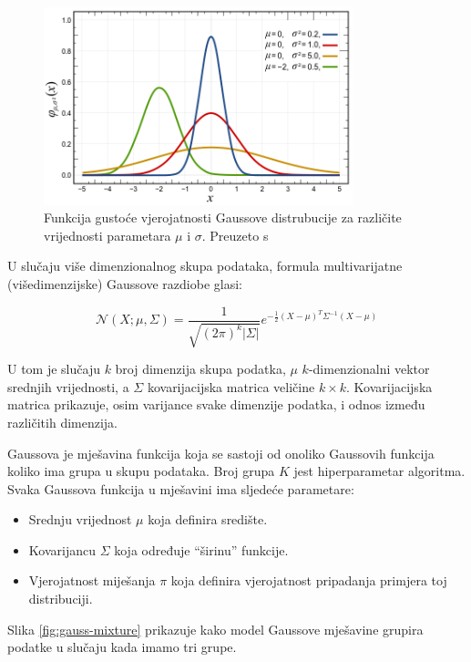 \documentclass[utf8, diplomski, numeric]{fer}
\begin{document}
\begin{figure}[htb]
\includegraphics[width=0.8\textwidth]{images/gauss1.png}
\centering
\caption{Funkcija gustoće vjerojatnosti Gaussove distrubucije za različite vrijednosti parametara $\mu$ i $\sigma$. Preuzeto s  \cite{normalDistWiki}}
\label{fig:gauss1}
\end{figure}

U slučaju više dimenzionalnog skupa podataka, formula multivarijatne (višedimenzijske) Gaussove razdiobe glasi:

\begin{equation}
\mathcal{N}(X;\mu,\Sigma)  =\frac{1}{\sqrt{(2\pi)^{k}|\Sigma|}}e^{-\frac{1}{2}(X-\mu)^T\Sigma^{-1}(X-\mu)}
\end{equation}

U tom je slučaju $k$ broj dimenzija skupa podatka, $\mu$ $k$-dimenzionalni vektor srednjih vrijednosti, a $\Sigma$ kovarijacijska matrica veličine $k \times k$. Kovarijacijska matrica prikazuje, osim varijance svake dimenzije podatka, i odnos između različitih dimenzija.

Gaussova je mješavina funkcija koja se sastoji od onoliko Gaussovih funkcija koliko ima grupa u skupu podataka. Broj grupa $K$ jest hiperparametar algoritma. Svaka Gaussova funkcija u mješavini ima sljedeće parametare:

\begin{itemize}
\item Srednju vrijednost $\mu$ koja definira središte.
\item Kovarijancu $\Sigma$  koja određuje ``širinu'' funkcije.
\item Vjerojatnost miješanja $\pi$ koja definira vjerojatnost pripadanja primjera toj distribuciji.
\end{itemize}

Slika \ref{fig:gauss-mixture} prikazuje kako model Gaussove mješavine grupira podatke u slučaju kada imamo tri grupe.
\end{document}
